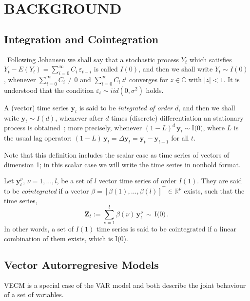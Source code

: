\section{\uppercase{Background}}
\label{sec:background}
\noindent

\subsection{Integration and Cointegration}\label{sec:coint}\  
Following Johansen \cite{johansen1995} we shall say that a stochastic process
$Y_t$ which satisfies $Y_t-E(Y_t) = \sum_{i=0}^\infty C_i\,\varepsilon_{t-i}$
is called $I(0)$, and then we shall write $Y_t\sim I(0)$, whenever
$\sum_{i=0}^\infty C_i \neq 0$ and $\sum_{i=0}^\infty C_i\,z^i$ converges for
$z\in\mathbb{C}$ with $|z|<1$.  It is understood that the condition
$\varepsilon_t\sim iid(0,\sigma^2)$ holds.

A (vector) time series $\mathbf{y}_t$ is said to be {\em integrated of order\/}
$d$, and then we shall write $\mathbf{y}_t\sim I(d)$, whenever after $d$ times
(discrete) differentiation an stationary process is
obtained~\cite{banerjee1993}; more precisely, whenever
$(1-L)^d\,\mathbf{y}_t\sim\text{I(0)}$, where $L$ is the usual lag operator:
$(1-L)\,\mathbf{y}_t = \Delta\mathbf{y}_t = \mathbf{y}_t-\mathbf{y}_{t-1}$ for
all $t$.  

Note that this definition includes the scalar case as time series of vectors of
dimension 1; in this scalar case we will write the time series in nonbold
format.

Let $\mathbf{y}_t^\nu$, $\nu=1,\dots,l$, be a set of $l$ vector time series of
order $I(1)$.  They are said to be {\em cointegrated\/} if a vector
$\beta=[\beta(1),\dots,\beta(l)]^\top \in \mathbb{R}^p$ exists, such that the
time series, \begin{equation} \mathbf{Z}_t:= \sum_{\nu=1}^l
\beta(\nu)\,\mathbf{y}_t^\nu\,\sim\,\text{I(0)}\,.  \end{equation} In other
words, a set of $I(1)$ time series is said to be cointegrated if a linear
combination of them exists, which is I(0).


\subsection{Vector Autorregresive Models}\label{sec:varvec}

VECM is a special case of the VAR \cite{sims1980} model and both describe the
joint behaviour of a set of variables.

